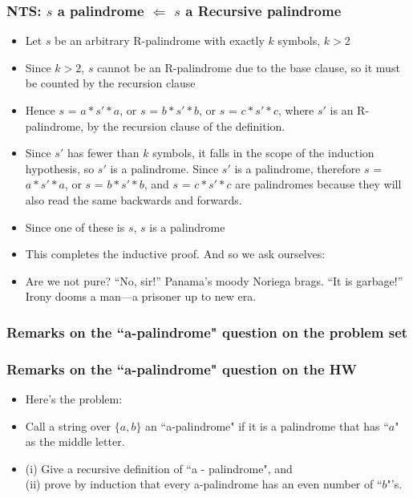 \begin{frame}
\frametitle{NTS: $s$ a palindrome $\Leftarrow$ $s$ a Recursive palindrome}


\begin{itemize}[<+->]
\item Let $s$ be an arbitrary R-palindrome with exactly $k$ symbols, $k >2$

\item Since $k > 2$, $s$ cannot be an R-palindrome due to the base clause, so it must be counted by the recursion clause

\item Hence $s$ = $a*s'*a$, or $s$ = $b*s'*b$, or $s$ = $c*s'*c$, where $s'$ is an R-palindrome, by the recursion clause of the definition.

\item Since $s'$ has fewer than $k$ symbols, it falls in the scope of the induction hypothesis, so $s'$ is a palindrome. Since $s'$ is a palindrome, therefore $s$ = $a*s'*a$, or $s$ = $b*s'*b$, and $s$ = $c*s'*c$ are palindromes because they will also read the same backwards and forwards. 

\item Since one of these is $s$, $s$ is a palindrome

\item This completes the inductive proof. And so we ask ourselves: 

\item[] \small{Are we not pure? “No, sir!” Panama’s moody Noriega brags. “It is garbage!” Irony dooms a man—a prisoner up to new era.}

\end{itemize} 

\end{frame}


\subsubsection{Remarks on the ``a-palindrome" question on the problem set}

\begin{frame}
\frametitle{Remarks on the ``a-palindrome" question on the HW}

\begin{itemize}[<+->]

\item Here's the problem:

\item Call a string over $\{a, b\}$ an ``a-palindrome" if it is a palindrome that has ``$a$" as the middle letter. 

\item (i) Give a recursive definition of ``a - palindrome", and \\ (ii) prove by induction that every a-palindrome has an even number of ``$b$"'s. 

\end{itemize} 
\end{frame}

